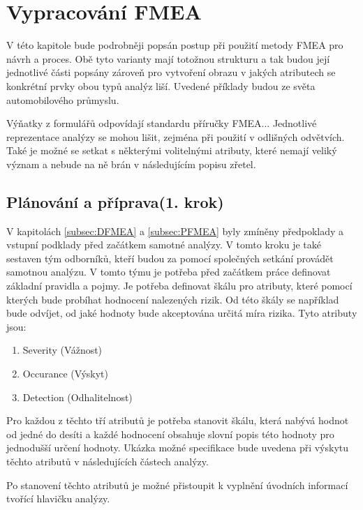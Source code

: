 \chapter{Vypracování FMEA }
\label{sec:FMEA_postup}
V této kapitole bude podrobněji popsán postup při použití metody FMEA pro návrh a proces. Obě tyto varianty mají totožnou strukturu a tak budou její jednotlivé části popsány zároveň pro vytvoření obrazu v jakých atributech se konkrétní prvky obou typů analýz liší. Uvedené příklady budou ze světa automobilového průmyslu. 

Výňatky z formulářů odpovídají standardu příručky FMEA... Jednotlivé reprezentace analýzy se mohou lišit, zejména při použití v odlišných odvětvích. Také je možné se setkat s některými volitelnými atributy, které nemají veliký význam a nebude na ně brán v následujícím popisu zřetel.  

\section{Plánování a příprava(1. krok)}
V kapitolách \ref{subsec:DFMEA} a \ref{subsec:PFMEA}  byly zmíněny předpoklady a vstupní podklady před začátkem samotné analýzy. V tomto kroku je také sestaven tým odborníků, kteří budou za pomocí společných setkání provádět samotnou analýzu. V tomto týmu je potřeba před začátkem práce definovat základní pravidla a pojmy. Je potřeba definovat škálu pro atributy, které pomocí kterých bude probíhat hodnocení nalezených rizik. Od této škály se například bude odvíjet, od jaké hodnoty bude akceptována určitá míra rizika. Tyto atributy jsou: 

\begin{enumerate}
	\item Severity (Vážnost)
	\item Occurance (Výskyt)
	\item Detection (Odhalitelnost)
\end{enumerate}

Pro každou z těchto tří atributů je potřeba stanovit škálu, která nabývá hodnot od jedné do desíti a každé hodnocení obsahuje slovní popis této hodnoty pro jednodušší určení hodnoty. Ukázka možné specifikace bude uvedena při výskytu těchto atributů v následujících částech analýzy.  

Po stanovení těchto atributů je možné přistoupit k vyplnění úvodních informací tvořící hlavičku analýzy. 

